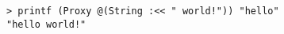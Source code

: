 \begin{repl}\begin{lstlisting}
> printf (Proxy @(String :<< " world!")) "hello"
"hello world!"\end{lstlisting}\end{repl}
